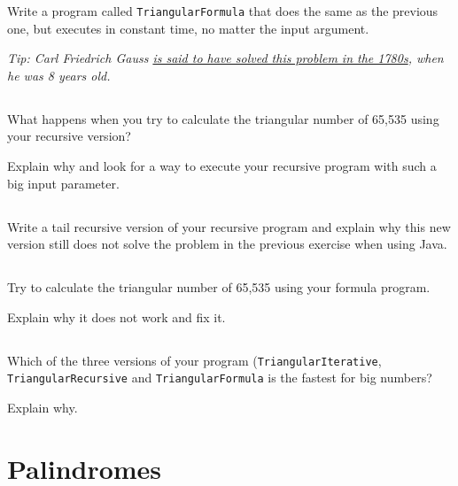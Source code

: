 \documentclass[a4paper, 11pt]{article}
\begin{document}
Write a program called \texttt{TriangularFormula} that does the same as the
previous one, but executes in constant time, no matter the input argument.

\textsl{Tip: Carl Friedrich Gauss
\href{http://www.americanscientist.org/issues/pub/gausss-day-of-reckoning/1}{is
said to have solved this problem in the 1780s}, when he was 8 years old.}


\subsection{}

What happens when you try to calculate the triangular number of 65,535 using
your recursive version?

Explain why and look for a way to execute your recursive program with such a
big input parameter.

\subsection{}

Write a tail recursive version of your recursive program and explain why this
new version still does not solve the problem in the previous exercise when using
Java.


\subsection{}

Try to calculate the triangular number of 65,535 using your formula program.

Explain why it does not work and fix it.


\subsection{}

Which of the three versions of your program (\texttt{TriangularIterative},
\texttt{TriangularRecursive} and \texttt{TriangularFormula} is the fastest
for big numbers?

Explain why.

\section{Palindromes}

\subsection{}
\end{document}
